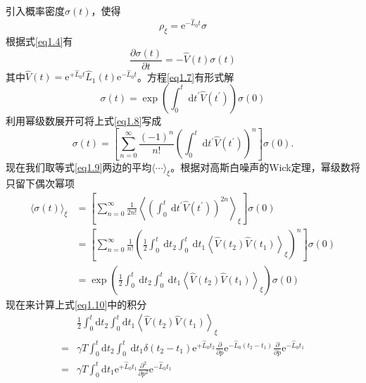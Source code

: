 引入概率密度$\sigma(t)$，使得
\begin{equation}
    \rho_{\xi}=\mathrm{e}^{-\hat{L}_{0} t} \sigma
    \label{eq1.6}
\end{equation}
根据式\eqref{eq1.4}有
\begin{equation}
    \frac{\partial \sigma(t)}{\partial t}=-\hat{V}(t) \sigma(t)
    \label{eq1.7}
\end{equation}
其中$\hat{V}(t)=\mathrm{e}^{+\hat{L}_{0} t} \hat{L}_{1}(t) \mathrm{e}^{-\hat{L}_{0} t}$。方程\eqref{eq1.7}有形式解
\begin{equation}
    \sigma(t)=\exp \left(\int_{0}^{t} \mathrm{~d} t^{\prime} \hat{V}\left(t^{\prime}\right)\right) \sigma(0)
    \label{eq1.8}
\end{equation}
利用幂级数展开可将上式\eqref{eq1.8}写成
\begin{equation}
    \sigma(t)=\left[\sum_{n=0}^{\infty} \frac{(-1)^{n}}{n !}\left(\int_{0}^{t} \mathrm{~d} t^{\prime} \hat{V}\left(t^{\prime}\right)\right)^{n}\right] \sigma(0) .
    \label{eq1.9}
\end{equation}
现在我们取等式\eqref{eq1.9}两边的平均$\langle \cdots \rangle_{\xi}$。根据对高斯白噪声的Wick定理，幂级数将只留下偶次幂项
\begin{equation}
    \begin{split}
        \langle\sigma(t)\rangle_{\xi}&=\left[\sum_{n=0}^{\infty} \frac{1}{2 n !}\left\langle\left(\int_{0}^{t} \mathrm{~d} t^{\prime} \hat{V}\left(t^{\prime}\right)\right)^{2 n}\right\rangle_{\xi}\right] \sigma(0)\\
        &=\left[\sum_{n=0}^{\infty} \frac{1}{n !}\left(\frac{1}{2} \int_{0}^{t} \mathrm{~d} t_{2} \int_{0}^{t} \mathrm{~d} t_{1}\left\langle\hat{V}\left(t_{2}\right) \hat{V}\left(t_{1}\right)\right\rangle_{\xi}\right)^{n}\right] \sigma(0)\\
        &=\exp \left(\frac{1}{2} \int_{0}^{t} \mathrm{~d} t_{2} \int_{0}^{t} \mathrm{~d} t_{1}\left\langle\hat{V}\left(t_{2}\right) \hat{V}\left(t_{1}\right)\right\rangle_{\xi}\right) \sigma(0)
    \end{split}
    \label{eq1.10}
\end{equation}
现在来计算上式\eqref{eq1.10}中的积分
\begin{equation}
    \begin{split}
    &\frac{1}{2} \int_{0}^{t} \mathrm{d} t_{2} \int_{0}^{t} \mathrm{d} t_{1}\left\langle\hat{V}\left(t_{2}\right) \hat{V}\left(t_{1}\right)\right\rangle_{\xi} \\
    =&\gamma T \int_{0}^{t} \mathrm{d} t_{2} \int_{0}^{t} \mathrm{~d} t_{1} \delta\left(t_{2}-t_{1}\right) \mathrm{e}^{+\hat{L}_{0} t_{2}} \frac{\partial}{\partial p} \mathrm{e}^{-\hat{L}_{0}\left(t_{2}-t_{1}\right)} \frac{\partial}{\partial p} \mathrm{e}^{-\hat{L}_{0} t_{1}} \\
    =&\gamma T \int_{0}^{t} \mathrm{d} t_{1} \mathrm{e}^{+\hat{L}_{0} t_{1}} \frac{\partial^{2}}{\partial p^{2}} \mathrm{e}^{-\hat{L}_{0} t_{1}}   
    \end{split}
    \label{eq1.11}
\end{equation}
